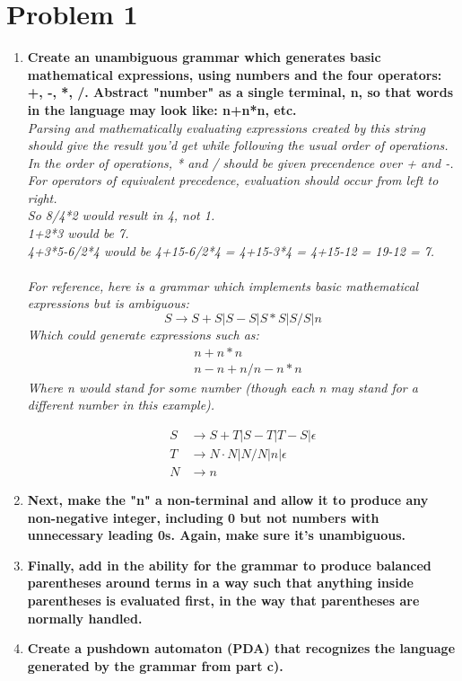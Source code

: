 \documentclass[11pt, a4paper]{article} %
\begin{document}
\section*{Problem 1}
\begin{enumerate}[label=\alph*.]
  \item \textbf{Create an unambiguous grammar which generates basic
    mathematical expressions, using numbers and the four operators: +, -, *, /.
  Abstract "number" as a single terminal, n, so that words in the language may
  look like: n+n*n, etc.}
  \\
\emph{Parsing and mathematically evaluating expressions created by this string
  should give the result you'd get while following the usual order of
  operations. In the order of operations, * and / should be given precendence
  over + and -. For operators of equivalent precedence, evaluation should occur
  from left to right.\\
So 8/4*2 would result in 4, not 1.\\
1+2*3 would be 7.\\
4+3*5-6/2*4 would be 4+15-6/2*4 = 4+15-3*4 =  4+15-12 = 19-12 = 7.\\
\\
For reference, here is a grammar which implements basic mathematical
expressions but is ambiguous:\\
\[ S \rightarrow S+S | S-S | S*S | S/S | n \]
Which could generate expressions such as:\\
\begin{align*}
&n+n*n\\
&n-n+n/n-n*n
\end{align*}
Where n would stand for some number (though each n may stand for a different
number in this example).}

\par

\begin{align*}
  S &\rightarrow S + T | S - T | T - S | \epsilon \\
  T &\rightarrow N \cdot N | N / N | n | \epsilon\\
  N &\rightarrow n
\end{align*}
\item \textbf{Next, make the "n" a non-terminal and allow it to produce any
  non-negative integer, including 0 but not numbers with unnecessary leading
0s. Again, make sure it's unambiguous.}
  \item \textbf{Finally, add in the ability for the grammar to
      produce balanced parentheses around terms in a way such that
      anything inside parentheses is evaluated first, in the way that
      parentheses are normally handled.}
  \item \textbf{Create a pushdown automaton (PDA) that recognizes the language
    generated by the grammar from part c).}

\end{enumerate}
\end{document}
